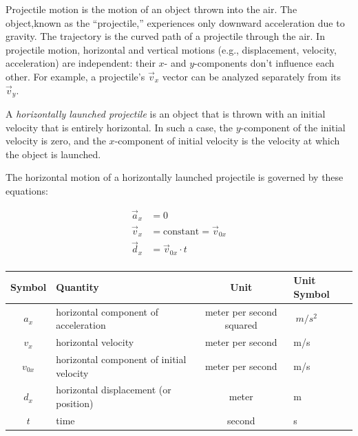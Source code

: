 \documentclass[main.tex]{subfiles}
\begin{document}
Projectile motion is the motion of an object thrown into the air. The object,known as the ``projectile,'' experiences only downward acceleration due to gravity. The trajectory is the curved path of a projectile through the air. In projectile motion, horizontal and vertical motions (e.g., displacement, velocity, acceleration) are independent: their $x$- and $y$-components don't influence each other. For example, a projectile's $\vec{v}_x$ vector can be analyzed separately from its $\vec{v}_y$.

A \textit{horizontally launched projectile} is an object that is thrown with an initial velocity that is entirely horizontal. In such a case, the $y$-component of the initial velocity is zero, and the $x$-component of initial velocity is the velocity at which the object is launched. 

\begin{mdframed}[backgroundcolor=black!10]
The horizontal motion of a horizontally launched projectile is governed by these equations:
\vspace{-1em}

\begin{align*}
    \vec{a}_x &= 0\\[0.5ex]
    \vec{v}_x &= \mathrm{constant} = \vec{v}_{0x}\\[0.5ex]
    \vec{d}_x &= \vec{v}_{0x} \cdot t\\[0.5ex]
\end{align*}
\vspace{-3em}

\begin{center}
        \begin{tabular}{cl|cl}
    \hline
    \textbf{Symbol} & \textbf{Quantity} & \textbf{Unit} & \textbf{Unit Symbol}  \\
    \hline\hline
        $a_x$ & horizontal component of acceleration & meter per second squared & $\SI{}{m/s^2}$\\
        $v_x$ & horizontal velocity & meter per second & m/s\\
        $v_{0x}$ & horizontal component of initial velocity & meter per second & m/s\\
        $d_x$ & horizontal displacement (or position) & meter & m\\
        $t$ & time & second & s\\
    \hline
    \end{tabular}
\end{center}
\end{mdframed}
\end{document}
